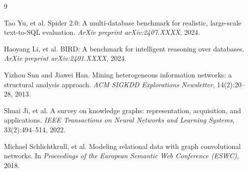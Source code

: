 \documentclass[11pt]{article}
\begin{document}
\begin{thebibliography}{9}

Tao Yu, et al.
\newblock Spider 2.0: A multi-database benchmark for realistic, large-scale text-to-SQL evaluation.
\newblock \emph{ArXiv preprint arXiv:2407.XXXX}, 2024.

Haoyang Li, et al.
\newblock BIRD: A benchmark for intelligent reasoning over databases.
\newblock \emph{ArXiv preprint arXiv:2401.XXXX}, 2024.

Yizhou Sun and Jiawei Han.
\newblock Mining heterogeneous information networks: a structural analysis approach.
\newblock \emph{ACM SIGKDD Explorations Newsletter}, 14(2):20--28, 2013.

Shuai Ji, et al.
\newblock A survey on knowledge graphs: representation, acquisition, and applications.
\newblock \emph{IEEE Transactions on Neural Networks and Learning Systems}, 33(2):494--514, 2022.

Michael Schlichtkrull, et al.
\newblock Modeling relational data with graph convolutional networks.
\newblock In \emph{Proceedings of the European Semantic Web Conference (ESWC)}, 2018.

\end{thebibliography}
\end{document}
